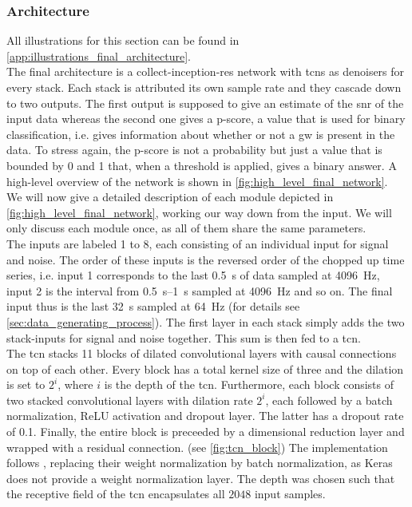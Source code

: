 \subsubsection{Architecture}\label{sec:final_architecture}
All illustrations for this section can be found in \autoref{app:illustrations_final_architecture}.\\
The final architecture is a collect-inception-res network with \gls{tcn}s as denoisers for every stack. Each stack is attributed its own sample rate and they cascade down to two outputs. The first output is supposed to give an estimate of the \gls{snr} of the input data whereas the second one gives a p-score, a value that is used for binary classification, i.e. gives information about whether or not a \gls{gw} is present in the data. To stress again, the p-score is not a probability but just a value that is bounded by 0 and 1 that, when a threshold is applied, gives a binary answer. A high-level overview of the network is shown in \autoref{fig:high_level_final_network}.\\
We will now give a detailed description of each module depicted in \autoref{fig:high_level_final_network}, working our way down from the input. We will only discuss each module once, as all of them share the same parameters.\\
The inputs are labeled 1 to 8, each consisting of an individual input for signal and noise. The order of these inputs is the reversed order of the chopped up time series, i.e. input 1 corresponds to the last \SI{0.5}{\s} of data sampled at \SI{4096}{\hertz}, input 2 is the interval from \SIrange{0.5}{1}{\s} sampled at \SI{4096}{\hertz} and so on. The final input thus is the last \SI{32}{\s} sampled at \SI{64}{\hertz} (for details see \autoref{sec:data_generating_process}). The first layer in each stack simply adds the two stack-inputs for signal and noise together. This sum is then fed to a \gls{tcn}.\\
The \gls{tcn} stacks 11 blocks of dilated convolutional layers with causal connections on top of each other. Every block has a total kernel size of three and the dilation is set to $2^i$, where $i$ is the depth of the \gls{tcn}. Furthermore, each block consists of two stacked convolutional layers with dilation rate $2^i$, each followed by a  batch normalization, ReLU activation and dropout layer. The latter has a dropout rate of 0.1. Finally, the entire block is preceeded by a dimensional reduction layer and wrapped with a residual connection. (see \autoref{fig:tcn_block}) The implementation follows \cite{tcn_paper}, replacing their weight normalization by batch normalization, as Keras does not provide a weight normalization layer. The depth was chosen such that the receptive field of the \gls{tcn} encapsulates all $2048$ input samples.\\
